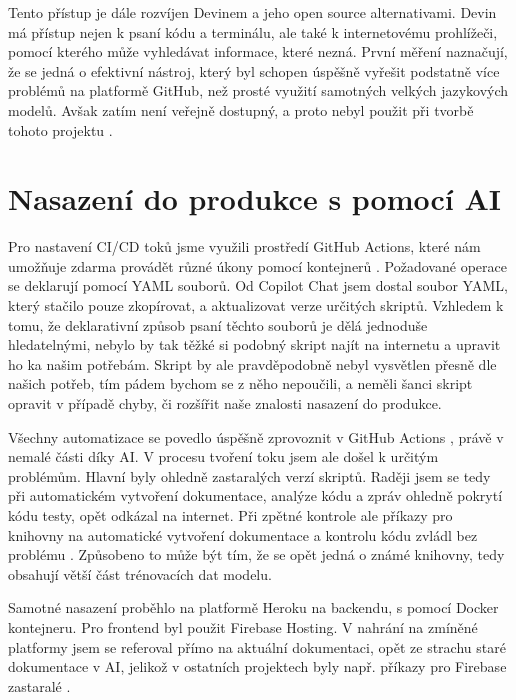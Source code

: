 \documentclass[FM,DP]{tulthesis}
\begin{document}
		Tento přístup je dále rozvíjen Devinem a jeho open source alternativami. Devin má přístup nejen k psaní kódu a terminálu, ale také k internetovému prohlížeči, pomocí kterého může vyhledávat informace, které nezná. První měření naznačují, že se jedná o efektivní nástroj, který byl schopen úspěšně vyřešit podstatně více problémů na platformě GitHub, než prosté využití samotných velkých jazykových modelů. Avšak zatím není veřejně dostupný, a proto nebyl použit při tvorbě tohoto projektu \cite{devin}.
		
		
		\section{Nasazení do produkce s pomocí AI}
		
		Pro nastavení CI/CD toků jsme využili prostředí GitHub Actions, které nám umožňuje zdarma provádět různé úkony pomocí kontejnerů \cite{ibm:containers} \cite{docker}. Požadované operace se deklarují pomocí YAML souborů. Od Copilot Chat jsem dostal soubor YAML, který stačilo pouze zkopírovat, a aktualizovat verze určitých skriptů. Vzhledem k tomu, že deklarativní způsob psaní těchto souborů je dělá jednoduše hledatelnými, nebylo by tak těžké si podobný skript najít na internetu a upravit ho ka našim potřebám. Skript by ale pravděpodobně nebyl vysvětlen přesně dle našich potřeb, tím pádem bychom se z něho nepoučili, a neměli šanci skript opravit v případě chyby, či rozšířit naše znalosti nasazení do produkce.
		
		Všechny automatizace se povedlo úspěšně zprovoznit v GitHub Actions \cite{GHA} \cite{cicd_t}, právě v nemalé části díky AI. V procesu tvoření toku jsem ale došel k určitým problémům. Hlavní byly ohledně zastaralých verzí skriptů. Raději jsem se tedy při automatickém vytvoření dokumentace, analýze kódu a zpráv ohledně pokrytí kódu testy, opět odkázal na internet. Při zpětné kontrole ale příkazy pro knihovny na automatické vytvoření dokumentace a kontrolu kódu zvládl bez problému \cite{codecov} \cite{static_ana}. Způsobeno to může být tím, že se opět jedná o známé knihovny, tedy obsahují větší část trénovacích dat modelu.
		
		Samotné nasazení proběhlo na platformě Heroku na backendu, s pomocí Docker kontejneru. Pro frontend byl použit Firebase Hosting. V nahrání na zmíněné platformy jsem se referoval přímo na aktuální dokumentaci, opět ze strachu staré dokumentace v AI, jelikož v ostatních projektech byly např. příkazy pro Firebase zastaralé \cite{firebase} \cite{docker} \cite{Heroku} \cite{ibm:containers} \cite{cors}.
		
\end{document}
